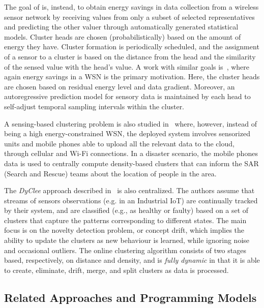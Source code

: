 The goal of \cite{DBLP:journals/tpds/GedikLY07} is, 
 instead, to obtain energy savings in data collection from a wireless sensor network by receiving values from only a subset of selected representatives and predicting the other valuer through automatically generated statistical models.
Cluster heads are chosen (probabilistically) based on the amount of energy they have. 
 Cluster formation is periodically scheduled, and the assignment of a sensor to a cluster is based on the distance from the head and the similarity of the sensed value with the head's value.
%
A work with similar goals is~\cite{DBLP:journals/ijdsn/CaiZ18}, 
 where again energy savings in a WSN is the primary motivation. 
 Here, the cluster heads are chosen based on residual energy level and data gradient.
 Moreover, an autoregressive prediction model for sensory data is maintained by each head to self-adjust temporal sampling intervals within the cluster.

A sensing-based clustering problem is also studied in~\cite{DBLP:journals/jaihc/KucukBSK20} where, 
 however, instead of being a high energy-constrained WSN, 
 the deployed system involves sensorized units and mobile phones able to upload all the relevant data to the cloud, through cellular and Wi-Fi connections. 
 In a disaster scenario, the mobile phones data is used to centrally compute density-based clusters that can inform the SAR (Search and Rescue) teams about the location of people in the area.

The {\em DyClee} approach described in~\cite{DBLP:journals/pr/RoaTG19} is also centralized. 
 The authors assume that streams of sensors observations (e.g. in an Industrial IoT) 
 are continually tracked by their system, 
 and are classified (e.g., as healthy or faulty) 
 based on a set of clusters that capture the patterns corresponding to different states. 
% 
The main focus is on the novelty detection problem, 
 or concept drift, which implies the ability to update the clusters as new behaviour is learned, while ignoring noise and occasional outliers. 
 The online clustering algorithm consists of two stages based, 
 respectively, on distance and density, and is {\em fully dynamic} in that it is able to create, eliminate, drift, merge, and split clusters as data is processed.

\subsection{Related Approaches and Programming Models}
\label{s:rw:related-approaches}

